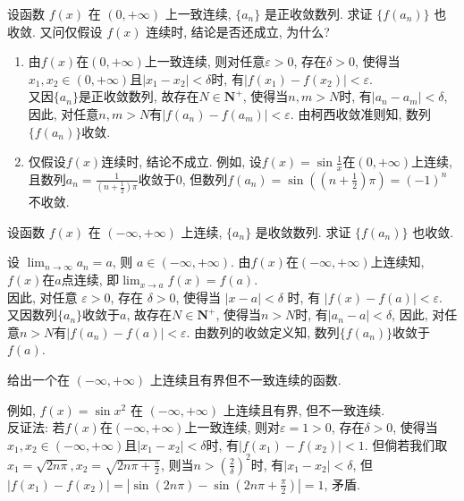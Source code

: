 \begin{exercise}[2.2.14]
    设函数 $f(x)$ 在 $(0, +\infty)$ 上一致连续, $\{a_n\}$ 是正收敛数列. 求证 $\{f(a_n)\}$ 也收敛. 又问仅假设 $f(x)$ 连续时, 结论是否还成立, 为什么?
\end{exercise}

\begin{solution}
    \begin{enumerate}
        \item 由$f(x)$在$(0,+\infty)$上一致连续, 则对任意$\varepsilon>0$, 存在$\delta>0$, 使得当$x_1,x_2\in(0,+\infty)$且$|x_1-x_2|<\delta$时, 有$|f(x_1)-f(x_2)|<\varepsilon$. \\
        又因$\{a_n\}$是正收敛数列, 故存在$N\in\mathbf{N}^+$, 使得当$n,m>N$时, 有$|a_n-a_m|<\delta$, 因此, 对任意$n,m>N$有$|f(a_n)-f(a_m)|<\varepsilon$. 由柯西收敛准则知, 数列$\{f(a_n)\}$收敛.
        \item 仅假设$f(x)$连续时, 结论不成立. 例如, 设$f(x)=\sin\frac{1}{x}$在$(0,+\infty)$上连续, 且数列$a_n=\frac{1}{(n+\frac{1}{2})\pi}$收敛于$0$, 但数列$f(a_n)=\sin\left( \left(n+\frac12\right) \pi\right)= (-1)^n$不收敛.
    \end{enumerate}
\end{solution}

\begin{exercise}[2.2.15]
    设函数 $f(x)$ 在 $(-\infty, +\infty)$ 上连续, $\{a_n\}$ 是收敛数列. 求证 $\{f(a_n)\}$ 也收敛.
\end{exercise}

\begin{solution}
    设 $\lim_{n \to \infty} a_n = a$, 则 $a \in (-\infty, +\infty)$. 由$f(x)$在$(-\infty,+\infty)$上连续知,$f(x)$在$a$点连续, 即$\lim_{x \to a} f(x) = f(a)$. \\
    因此, 对任意 $\varepsilon > 0$, 存在 $\delta > 0$, 使得当 $|x - a| < \delta$ 时, 有 $|f(x) - f(a)| < \varepsilon$.\\
    又因数列$\{a_n\}$收敛于$a$, 故存在$N\in\mathbf{N}^+$, 使得当$n>N$时, 有$|a_n-a|<\delta$, 因此, 对任意$n>N$有$|f(a_n)-f(a)|<\varepsilon$. 由数列的收敛定义知, 数列$\{f(a_n)\}$收敛于$f(a)$.
\end{solution}

\begin{exercise}[2.2.16]
    给出一个在 $(-\infty, +\infty)$ 上连续且有界但不一致连续的函数.
\end{exercise}

\begin{solution}
    例如, $f(x) = \sin x^2$ 在 $(-\infty, +\infty)$ 上连续且有界, 但不一致连续. \\
    反证法: 若$f(x)$在$(-\infty,+\infty)$上一致连续, 则对$\varepsilon=1>0$, 存在$\delta>0$, 使得当$x_1,x_2\in(-\infty,+\infty)$且$|x_1-x_2|<\delta$时, 有$|f(x_1)-f(x_2)|<1$. 但倘若我们取$x_1=\sqrt{2n\pi}, x_2=\sqrt{2n\pi+\frac{\pi}{2}}$, 则当$n>\left(\frac{2}{\delta}\right)^2$时, 有$|x_1-x_2|<\delta$, 但$|f(x_1)-f(x_2)|=\left|\sin(2n\pi)-\sin\left(2n\pi+\frac{\pi}{2}\right)\right|=1$, 矛盾.
\end{solution}

\newpage